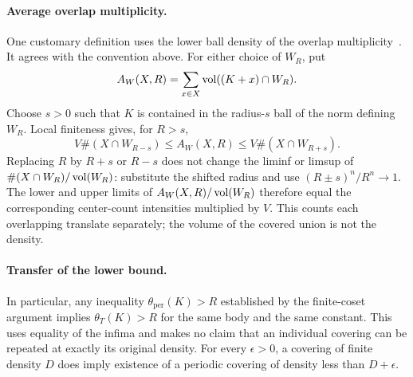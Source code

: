 \paragraph{Average overlap multiplicity.}
One customary definition uses the lower ball density of the overlap
multiplicity~\cite[Section~1.1]{Prosanov2021PackingCovering}. It agrees
with the convention above. For either choice of $W_R$, put
\[
 A_W(X,R)=\sum_{x\in X}\operatorname{vol}((K+x)\cap W_R).
\]
Choose $s>0$ such that $K$ is contained in the radius-$s$ ball of the
norm defining $W_R$. Local finiteness gives, for $R>s$,
\[
 V\#(X\cap W_{R-s})\le A_W(X,R)
 \le V\#(X\cap W_{R+s}).
\]
Replacing $R$ by $R+s$ or $R-s$ does not change the liminf or limsup of
$\#(X\cap W_R)/\operatorname{vol}(W_R)$: substitute the shifted radius and use
$(R\pm s)^n/R^n\to1$. The lower and upper limits of
$A_W(X,R)/\operatorname{vol}(W_R)$ therefore equal the corresponding center-count intensities
multiplied by $V$. This counts each overlapping translate separately;
the volume of the covered union is not the density.

\paragraph{Transfer of the lower bound.}
In particular, any inequality $\theta_{\mathrm{per}}(K)>R$ established
by the finite-coset argument implies $\theta_T(K)>R$ for the same body
and the same constant. This uses equality of the infima and makes no
claim that an individual covering can be repeated at exactly its original
density. For every $\epsilon>0$, a covering of finite density $D$
does imply existence of a periodic covering of density less than
$D+\epsilon$.
